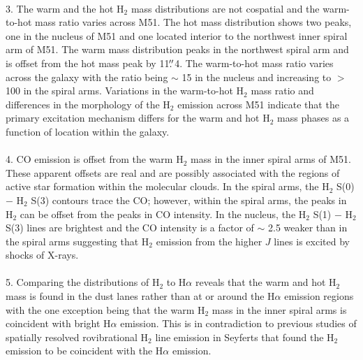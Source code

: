 \documentclass[manuscript]{aastex}
\begin{document}
\\
3.  The warm and the hot $\mathrm{H_2}$ mass distributions are not cospatial and the warm-to-hot mass ratio varies across M51.  The hot mass distribution shows two peaks, one in the nucleus of M51 and one located interior to the northwest inner spiral arm of M51.  The warm mass distribution peaks in the northwest spiral arm and is offset from the hot mass peak by 11$\mbox{$.\!\!^{\prime\prime}$}$4.  The warm-to-hot mass ratio varies across the galaxy with the ratio being $\sim$ 15 in the nucleus and increasing to $>$ 100 in the spiral arms.  Variations in the warm-to-hot $\mathrm{H_2}$ mass ratio and differences in the morphology of the $\mathrm{H_2}$ emission across M51 indicate that the primary excitation mechanism differs for the warm and hot $\mathrm{H_2}$ mass phases as a function of location within the galaxy.\\
\\
4. CO emission is offset from the warm $\mathrm{H_2}$ mass in the inner spiral arms of M51.  These apparent offsets are real and are possibly associated with the regions of active star formation within the molecular clouds.  In the spiral arms, the $\mathrm{H_2}$ S(0) $-$ $\mathrm{H_2}$ S(3) contours trace the CO; however, within the spiral arms, the peaks in $\mathrm{H_2}$ can be offset from the peaks in CO intensity.  In the nucleus, the $\mathrm{H_2}$ S(1) $-$ $\mathrm{H_2}$ S(3) lines are brightest and the CO intensity is a factor of $\sim$ 2.5 weaker than in the spiral arms suggesting that $\mathrm{H_2}$ emission from the higher $J$ lines is excited by shocks of X-rays.\\
\\
5.  Comparing the distributions of $\mathrm{H_2}$ to H$\alpha$ reveals that the warm and hot $\mathrm{H_2}$ mass is found in the dust lanes rather than at or around the H$\alpha$ emission regions with the one exception being that the warm $\mathrm{H_2}$ mass in the inner spiral arms is coincident with bright H$\alpha$ emission.  This is in contradiction to previous studies of spatially resolved rovibrational $\mathrm{H_2}$ line emission in Seyferts that found the $\mathrm{H_2}$ emission to be coincident with the H$\alpha$ emission.\\
\end{document}
